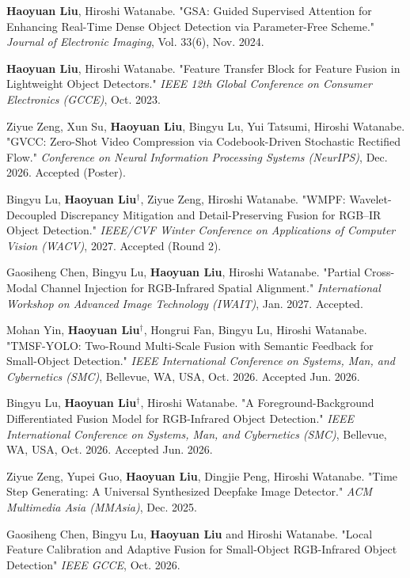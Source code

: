 \documentclass[letterpaper,11pt]{article}
\newcommand{\resumeItem}[1]{
  \item[$\vcenter{\hbox{\tiny$\bullet$}}$]\small{
    {#1 \vspace{-2pt}}
  }
}
\begin{document}
    \resumeItem{\textbf{Haoyuan Liu}, Hiroshi Watanabe. "GSA: Guided Supervised Attention for Enhancing Real-Time Dense Object Detection via Parameter-Free Scheme." \textit{Journal of Electronic Imaging}, Vol. 33(6), Nov. 2024.}

    \resumeItem{\textbf{Haoyuan Liu}, Hiroshi Watanabe. "Feature Transfer Block for Feature Fusion in Lightweight Object Detectors." \textit{IEEE 12th Global Conference on Consumer Electronics (GCCE)}, Oct. 2023.}

    \resumeItem{Ziyue Zeng, Xun Su, \textbf{Haoyuan Liu}, Bingyu Lu, Yui Tatsumi, Hiroshi Watanabe. "GVCC: Zero-Shot Video Compression via Codebook-Driven Stochastic Rectified Flow." \textit{Conference on Neural Information Processing Systems (NeurIPS)}, Dec. 2026. Accepted (Poster).}

    \resumeItem{Bingyu Lu, \textbf{Haoyuan Liu}$^{\dagger}$, Ziyue Zeng, Hiroshi Watanabe. "WMPF: Wavelet-Decoupled Discrepancy Mitigation and Detail-Preserving Fusion for RGB--IR Object Detection." \textit{IEEE/CVF Winter Conference on Applications of Computer Vision (WACV)}, 2027. Accepted (Round 2).}

    \resumeItem{Gaosiheng Chen, Bingyu Lu, \textbf{Haoyuan Liu}, Hiroshi Watanabe. "Partial Cross-Modal Channel Injection for RGB-Infrared Spatial Alignment." \textit{International Workshop on Advanced Image Technology (IWAIT)}, Jan. 2027. Accepted.}

    \resumeItem{Mohan Yin, \textbf{Haoyuan Liu}$^{\dagger}$, Hongrui Fan, Bingyu Lu, Hiroshi Watanabe. "TMSF-YOLO: Two-Round Multi-Scale Fusion with Semantic Feedback for Small-Object Detection." \textit{IEEE International Conference on Systems, Man, and Cybernetics (SMC)}, Bellevue, WA, USA, Oct. 2026. Accepted Jun. 2026.}

    \resumeItem{Bingyu Lu, \textbf{Haoyuan Liu}$^{\dagger}$, Hiroshi Watanabe. "A Foreground-Background Differentiated Fusion Model for RGB-Infrared Object Detection." \textit{IEEE International Conference on Systems, Man, and Cybernetics (SMC)}, Bellevue, WA, USA, Oct. 2026. Accepted Jun. 2026.}

    \resumeItem{Ziyue Zeng, Yupei Guo, \textbf{Haoyuan Liu}, Dingjie Peng, Hiroshi Watanabe. "Time Step Generating: A Universal Synthesized Deepfake Image Detector." \textit{ACM Multimedia Asia (MMAsia)}, Dec. 2025.}

    \resumeItem{Gaosiheng Chen, Bingyu Lu, \textbf{Haoyuan Liu} and Hiroshi Watanabe. "Local Feature Calibration and Adaptive Fusion for Small-Object RGB-Infrared Object Detection" \textit{IEEE GCCE}, Oct. 2026.}
\end{document}
